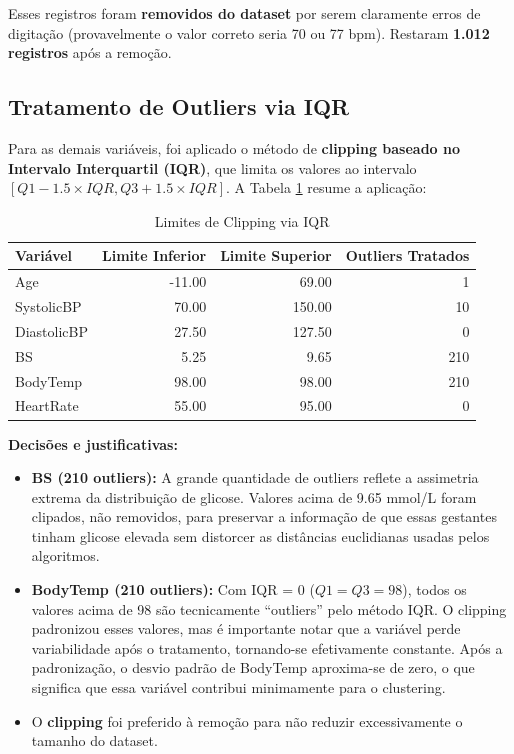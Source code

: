 \documentclass[12pt]{article}
\begin{document}
Esses registros foram \textbf{removidos do dataset} por serem claramente erros de digitação (provavelmente o valor correto seria 70 ou 77 bpm). Restaram \textbf{1.012 registros} após a remoção.

\subsection{Tratamento de Outliers via IQR}
Para as demais variáveis, foi aplicado o método de \textbf{clipping baseado no Intervalo Interquartil (IQR)}, que limita os valores ao intervalo $[Q1 - 1.5 \times IQR, Q3 + 1.5 \times IQR]$. A Tabela \ref{tab:clipping} resume a aplicação:

\begin{table}[H]
\centering
\caption{Limites de Clipping via IQR}
\label{tab:clipping}
\begin{tabular}{lrrr}
\toprule
\textbf{Variável} & \textbf{Limite Inferior} & \textbf{Limite Superior} & \textbf{Outliers Tratados} \\
\midrule
Age & -11.00 & 69.00 & 1 \\
SystolicBP & 70.00 & 150.00 & 10 \\
DiastolicBP & 27.50 & 127.50 & 0 \\
BS & 5.25 & 9.65 & 210 \\
BodyTemp & 98.00 & 98.00 & 210 \\
HeartRate & 55.00 & 95.00 & 0 \\
\bottomrule
\end{tabular}
\end{table}

\textbf{Decisões e justificativas:}
\begin{itemize}
    \item \textbf{BS (210 outliers):} A grande quantidade de outliers reflete a assimetria extrema da distribuição de glicose. Valores acima de 9.65 mmol/L foram clipados, não removidos, para preservar a informação de que essas gestantes tinham glicose elevada sem distorcer as distâncias euclidianas usadas pelos algoritmos.
    \item \textbf{BodyTemp (210 outliers):} Com IQR = 0 ($Q1 = Q3 = 98$), todos os valores acima de 98 são tecnicamente ``outliers'' pelo método IQR. O clipping padronizou esses valores, mas é importante notar que a variável perde variabilidade após o tratamento, tornando-se efetivamente constante. Após a padronização, o desvio padrão de BodyTemp aproxima-se de zero, o que significa que essa variável contribui minimamente para o clustering.
    \item O \textbf{clipping} foi preferido à remoção para não reduzir excessivamente o tamanho do dataset.
\end{itemize}
\end{document}
